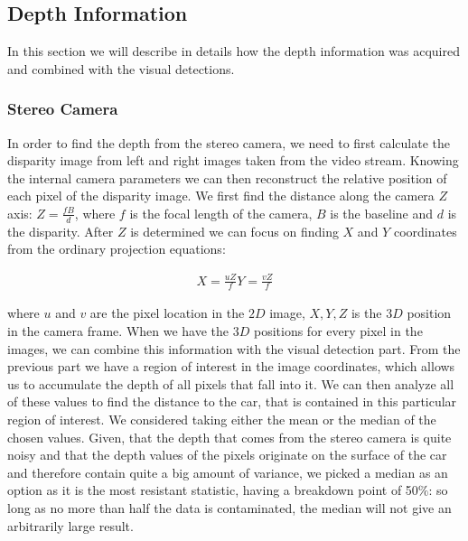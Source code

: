 
    \subsection{Depth Information}\label{sub:depth_information}

        In this section we will describe in details how the depth information
        was acquired and combined with the visual detections.

        \subsubsection{Stereo Camera}\label{ssub:stereo_camera}

            In order to find the depth from the stereo camera, we need to
            first calculate the disparity image from left and right images
            taken from the video stream. Knowing the internal camera
            parameters we can then reconstruct the relative position of each
            pixel of the disparity image. We first find the distance along the
            camera $Z$ axis: $Z = \frac{fB}{d}$, where $f$ is the focal length
            of the camera, $B$ is the baseline and $d$ is the disparity. After
            $Z$ is determined we can focus on finding $X$ and $Y$ coordinates
            from the ordinary projection equations:

            \begin{eqnarray}
            X = \frac{uZ}{f}
            Y = \frac{vZ}{f}
            \end{eqnarray}

            where $u$ and $v$ are the pixel location in the $2D$ image, $X, Y,
            Z$ is the $3D$ position in the camera frame. When we have the $3D$
            positions for every pixel in the images, we can combine this
            information with the visual detection part. From the previous part
            we have a region of interest in the image coordinates, which
            allows us to accumulate the depth of all pixels that fall into it.
            We can then analyze all of these values to find the distance to
            the car, that is contained in this particular region of interest.
            We considered taking either the mean or the median of the chosen
            values. Given, that the depth that comes from the stereo camera is
            quite noisy and that the depth values of the pixels originate on
            the surface of the car and therefore contain quite a big amount of
            variance, we picked a median as an option as it is the most
            resistant statistic, having a breakdown point of 50$\%$: so long
            as no more than half the data is contaminated, the median will not
            give an arbitrarily large result.

